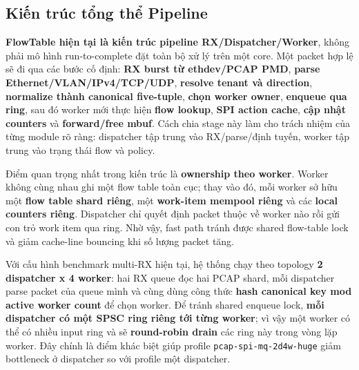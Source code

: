 \documentclass[12pt,a4paper,twoside]{report}
\newcommand{\code}[1]{\texttt{#1}}
\begin{document}
\subsection{Kiến trúc tổng thể Pipeline}
\textbf{FlowTable hiện tại là kiến trúc pipeline RX/Dispatcher/Worker}, không
phải mô hình run-to-complete đặt toàn bộ xử lý trên một core. Một packet hợp lệ
sẽ đi qua các bước cố định: \textbf{RX burst từ ethdev/PCAP PMD}, \textbf{parse
Ethernet/VLAN/IPv4/TCP/UDP}, \textbf{resolve tenant và direction},
\textbf{normalize thành canonical five-tuple}, \textbf{chọn worker owner},
\textbf{enqueue qua ring}, sau đó worker mới thực hiện \textbf{flow lookup},
\textbf{SPI action cache}, \textbf{cập nhật counters} và \textbf{forward/free
mbuf}. Cách chia stage này làm cho trách nhiệm của từng module rõ ràng: dispatcher
tập trung vào RX/parse/định tuyến, worker tập trung vào trạng thái flow và
policy.

Điểm quan trọng nhất trong kiến trúc là \textbf{ownership theo worker}. Worker
không cùng nhau ghi một flow table toàn cục; thay vào đó, mỗi worker sở hữu một
\textbf{flow table shard riêng}, một \textbf{work-item mempool riêng} và các
\textbf{local counters riêng}. Dispatcher chỉ quyết định packet thuộc về worker
nào rồi gửi con trỏ work item qua ring. Nhờ vậy, fast path tránh được shared
flow-table lock và giảm cache-line bouncing khi số lượng packet tăng.

Với cấu hình benchmark multi-RX hiện tại, hệ thống chạy theo topology
\textbf{2 dispatcher x 4 worker}: hai RX queue đọc hai PCAP shard, mỗi dispatcher
parse packet của queue mình và cùng dùng công thức \textbf{hash canonical key
mod active worker count} để chọn worker. Để tránh shared enqueue lock, \textbf{mỗi
dispatcher có một SPSC ring riêng tới từng worker}; vì vậy một worker có thể có
nhiều input ring và sẽ \textbf{round-robin drain} các ring này trong vòng lặp
worker. Đây chính là điểm khác biệt giúp profile \code{pcap-spi-mq-2d4w-huge}
giảm bottleneck ở dispatcher so với profile một dispatcher.
\end{document}
